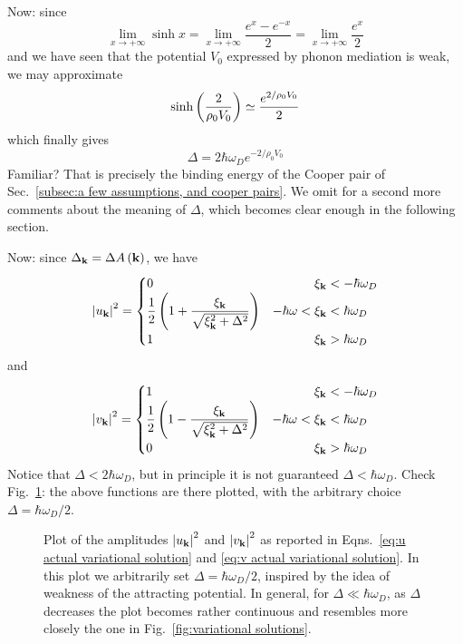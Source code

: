 Now: since
\[
	\lim_{x\to+\infty} \sinh x = \lim_{x\to+\infty} \frac{e^x - e^{-x}}{2} = \lim_{x\to+\infty} \frac{e^x}{2}
\]
and we have seen that the potential $V_0$ expressed by phonon mediation is weak, we may approximate
\[
	\sinh\left({\frac{2}{\rho_0 V_0}}\right) \simeq \frac{e^{2/\rho_0 V_0}}{2}
\]
which finally gives
\[
	\Delta = 2 \hbar\omega_D e^{-2/\rho_0 V_0}
\]
Familiar? That is precisely the binding energy of the Cooper pair of Sec.~\ref{subsec:a few assumptions, and cooper pairs}. We omit for a second more comments about the meaning of $\Delta$, which becomes clear enough in the following section.

Now: since $\Delta_\mathbf{k} = \Delta A\left({\mathbf{k}}\right)$, we have
\begin{equation}\label{eq:u actual variational solution}
	\abs{u_\mathbf{k}}^2 = \begin{cases}
		0 &\hphantom{-\hbar\omega <{}}\xi_\mathbf{k} < -\hbar\omega_D\\
		\displaystyle\frac{1}{2} \lrR{1 + \frac{\xi_\mathbf{k}}{\sqrt{\xi_\mathbf{k}^2 + \Delta^2}}} &-\hbar\omega <\xi_\mathbf{k} < \hbar\omega_D\\
		1 &\hphantom{-\hbar\omega <{}}\xi_\mathbf{k} > \hbar\omega_D
	\end{cases}
\end{equation}
and
\begin{equation}\label{eq:v actual variational solution}
	\abs{v_\mathbf{k}}^2 = \begin{cases}
		1 &\hphantom{-\hbar\omega <{}}\xi_\mathbf{k} < -\hbar\omega_D\\
		\displaystyle\frac{1}{2} \lrR{1 - \frac{\xi_\mathbf{k}}{\sqrt{\xi_\mathbf{k}^2 + \Delta^2}}} &-\hbar\omega <\xi_\mathbf{k} < \hbar\omega_D\\
		0 &\hphantom{-\hbar\omega <{}}\xi_\mathbf{k} > \hbar\omega_D
	\end{cases}
\end{equation}
Notice that $\Delta < 2\hbar\omega_D$, but in principle it is not guaranteed $\Delta < \hbar\omega_D$. Check Fig.~\ref{fig:actual variational solutions}: the above functions are there plotted, with the arbitrary choice $\Delta = \hbar\omega_D/2$.

\begin{figure}
	\centering
	
	\caption{Plot of the amplitudes $\abs{u_\mathbf{k}}^2$ and $\abs{v_\mathbf{k}}^2$ as reported in Eqns.~\eqref{eq:u actual variational solution} and \eqref{eq:v actual variational solution}. In this plot we arbitrarily set $\Delta = \hbar\omega_D/2$, inspired by the idea of weakness of the attracting potential. In general, for $\Delta \ll \hbar\omega_D$, as $\Delta$ decreases the plot becomes rather continuous and resembles more closely the one in Fig.~\ref{fig:variational solutions}.}
	\label{fig:actual variational solutions}
\end{figure}


